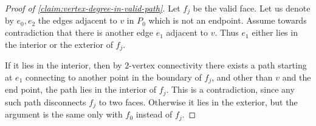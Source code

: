 \documentclass[10pt,a4paper]{article}
\newcommand{\prettyref}[1]{\cref{#1}}
\theoremstyle{definition}
\theoremstyle{remark}
\newcommand{\Authornotecolored}[3]{{\sffamily\small\color{#1}{[#2: #3]}}}
\newcommand{\Authornotecolored}[3]{}
\newcommand{\Ynote}{\Authornotecolored{Purple}{Y}}
\newcommand{\set}[1]{\{#1\}}
\numberwithin{equation}{section}
\let\pref=\prettyref
\begin{document}

\begin{proof}[Proof of \pref{claim:vertex-degree-in-valid-path}]
    Let \(f_j\) be the valid face. Let us denote by \(e_0,e_2\) the edges adjacent to \(v\) in \(P_0\) which is not an endpoint. Assume towards contradiction that there is another edge \(e_1\) adjacent to \(v\). Thus \(e_1\) either lies in the interior or the exterior of \(f_j\).

    If it lies in the interior, then by \(2\)-vertex connectivity there exists a path starting at \(e_1\) connecting to another point in the boundary of \(f_{j}\), and other than \(v\) and the end point, the path lies in the interior of \(f_{j}\). This is a contradiction, since any such path disconnects \(f_{j}\) to two faces. Otherwise it lies in the exterior, but the argument is the same only with \(f_0\) instead of \(f_j\). %
\end{proof}
\end{document}
